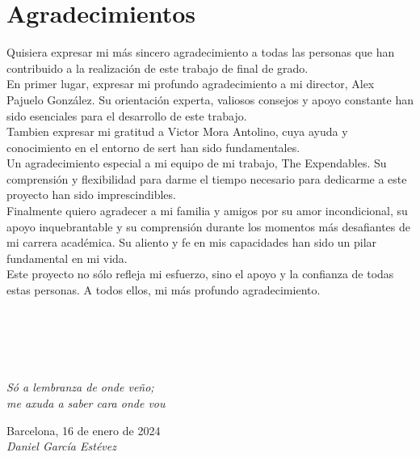 \cleardoublepage

\chapter*{Agradecimientos}

Quisiera expresar mi más sincero agradecimiento a todas las personas que han contribuido a la realización de este trabajo de final de grado.\\

En primer lugar, expresar mi profundo agradecimiento a mi director, Alex Pajuelo González. Su orientación experta, valiosos consejos y apoyo constante han sido esenciales para el desarrollo de este trabajo.\\

Tambien expresar mi gratitud a Victor Mora Antolino, cuya ayuda y conocimiento en el entorno de sert han sido fundamentales. \\

Un agradecimiento especial a mi equipo de mi trabajo, The Expendables. Su comprensión y flexibilidad para darme el tiempo necesario para dedicarme a este proyecto han sido imprescindibles.\\

Finalmente quiero agradecer a mi familia y amigos por su amor incondicional, su apoyo inquebrantable y su comprensión durante los momentos más desafiantes de mi carrera académica. Su aliento y fe en mis capacidades han sido un pilar fundamental en mi vida.\\

Este proyecto no sólo refleja mi esfuerzo, sino el apoyo y la confianza de todas estas personas. A todos ellos, mi más profundo agradecimiento.\\
\

\

\

\begin{flushright}
		\vspace{4.0 cm}
		\emph{Só a lembranza de onde veño;\\
        me axuda a saber cara onde vou}\\
		\par
		\vspace{1.0 cm}
		Barcelona, 16 de enero de 2024\\
		\emph{Daniel García Estévez}
\end{flushright}

\thispagestyle{empty}
